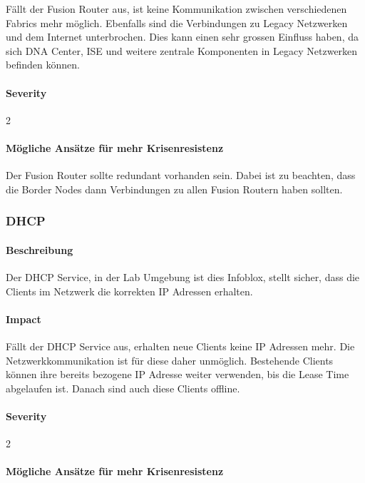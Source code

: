 Fällt der Fusion Router aus, ist keine Kommunikation zwischen verschiedenen Fabrics mehr möglich. Ebenfalls sind die Verbindungen zu Legacy Netzwerken und dem Internet unterbrochen. Dies kann einen sehr grossen Einfluss haben, da sich DNA Center, ISE und weitere zentrale Komponenten in Legacy Netzwerken befinden können.

\paragraph{Severity} 2

\paragraph{Mögliche Ansätze für mehr Krisenresistenz}

Der Fusion Router sollte redundant vorhanden sein. Dabei ist zu beachten, dass die Border Nodes dann Verbindungen zu allen Fusion Routern haben sollten.

\subsubsection{DHCP}

\paragraph{Beschreibung}

Der DHCP Service, in der Lab Umgebung ist dies Infoblox, stellt sicher, dass die Clients im Netzwerk die korrekten IP Adressen erhalten.

\paragraph{Impact}

Fällt der DHCP Service aus, erhalten neue Clients keine IP Adressen mehr. Die Netzwerkkommunikation ist für diese daher unmöglich. Bestehende Clients können ihre bereits bezogene IP Adresse weiter verwenden, bis die Lease Time abgelaufen ist. Danach sind auch diese Clients offline.

\paragraph{Severity} 2

\paragraph{Mögliche Ansätze für mehr Krisenresistenz}

